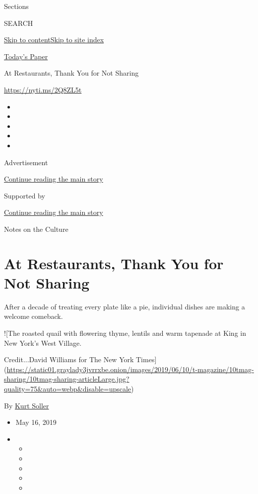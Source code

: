 Sections

SEARCH

\protect\hyperlink{site-content}{Skip to
content}\protect\hyperlink{site-index}{Skip to site index}

\href{https://myaccount.nytimes3xbfgragh.onion/auth/login?response_type=cookie\&client_id=vi}{}

\href{https://www.nytimes3xbfgragh.onion/section/todayspaper}{Today's
Paper}

At Restaurants, Thank You for Not Sharing

\url{https://nyti.ms/2Q8ZL5t}

\begin{itemize}
\item
\item
\item
\item
\item
\end{itemize}

Advertisement

\protect\hyperlink{after-top}{Continue reading the main story}

Supported by

\protect\hyperlink{after-sponsor}{Continue reading the main story}

Notes on the Culture

\hypertarget{at-restaurants-thank-you-for-not-sharing}{%
\section{At Restaurants, Thank You for Not
Sharing}\label{at-restaurants-thank-you-for-not-sharing}}

After a decade of treating every plate like a pie, individual dishes are
making a welcome comeback.

!{[}The roasted quail with flowering thyme, lentils and warm tapenade at
King in New York's West Village.

Credit...David Williams for The New York
Times{]}(\url{https://static01.graylady3jvrrxbe.onion/images/2019/06/10/t-magazine/10tmag-sharing/10tmag-sharing-articleLarge.jpg?quality=75\&auto=webp\&disable=upscale})

By \href{https://www.nytimes3xbfgragh.onion/by/kurt-soller}{Kurt Soller}

\begin{itemize}
\item
  May 16, 2019
\item
  \begin{itemize}
  \item
  \item
  \item
  \item
  \item
  \end{itemize}
\end{itemize}

